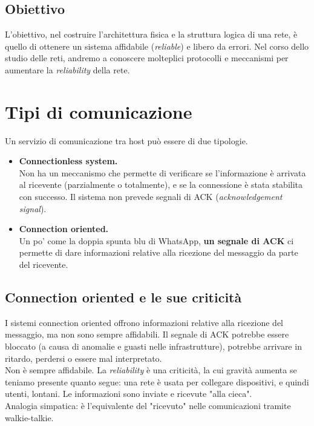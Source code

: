 \subsection{Obiettivo}
L'obiettivo, nel costruire l'architettura fisica e la struttura logica di una rete, è quello di ottenere un sistema affidabile (\textit{reliable}) e libero da errori. Nel corso dello studio delle reti, andremo a conoscere molteplici protocolli e meccanismi per aumentare la \textit{reliability} della rete.

\newpage

\section{Tipi di comunicazione}
Un servizio di comunicazione tra host può essere di due tipologie. 
\begin{itemize}
    \item \textbf{Connectionless system.}\\
    Non ha un meccanismo che permette di verificare se l'informazione è arrivata al ricevente (parzialmente o totalmente), e se la connessione è stata stabilita con successo. Il sistema non prevede segnali di ACK (\textit{acknowledgement signal}).
    \item \textbf{Connection oriented.}\\
    Un po' come la doppia spunta blu di WhatsApp, \textbf{un segnale di ACK} ci permette di dare informazioni relative alla ricezione del messaggio da parte del ricevente.
\end{itemize}

\subsection{Connection oriented e le sue criticità}
I sistemi connection oriented offrono informazioni relative alla ricezione del messaggio, ma non sono sempre affidabili. Il segnale di ACK potrebbe essere bloccato (a causa di anomalie e guasti nelle infrastrutture), potrebbe arrivare in ritardo, perdersi o essere mal interpretato.\\
Non è sempre affidabile. La \textit{reliability} è una criticità, la cui gravità aumenta se teniamo presente quanto segue: una rete è usata per collegare dispositivi, e quindi utenti, lontani. Le informazioni sono inviate e ricevute "alla cieca".\\ 
Analogia simpatica: è l'equivalente del "ricevuto" nelle comunicazioni tramite walkie-talkie.

